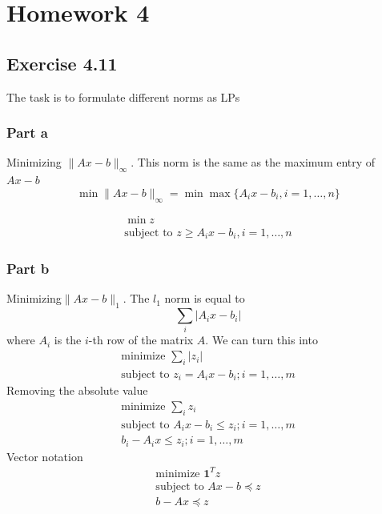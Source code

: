 \section{Homework 4}
\subsection{Exercise 4.11}
The task is to formulate different norms as LPs
\subsubsection{Part a}
Minimizing $\| Ax-b \|_\infty$. This norm is the same as the maximum entry of $Ax-b$
\begin{equation}
  \min \| Ax-b \|_\infty = \min \max \{A_i x - b_i, i=1,\dots,n\} 
\end{equation}

\begin{equation}
  \begin{aligned}
    \min z \\
    \text{subject to } z \geq A_i x - b_i, i = 1,\dots, n
  \end{aligned}
\end{equation}

\subsubsection{Part b}
Minimizing$\| Ax-b \|_1$. The $l_1$ norm is equal to
\begin{equation}
  \sum_i |A_i x - b_i |
\end{equation}
where $A_i$ is the $i$-th row of the matrix $A$. We can turn this into
\begin{equation}
  \begin{aligned}
    \text{minimize } \sum_i |z_i| \\ 
    \text{subject to } z_i = A_i x - b_i; i = 1,\dots,m
  \end{aligned}
\end{equation}
Removing the absolute value
\begin{equation}
  \begin{aligned}
    \text{minimize } \sum_i z_i \\ 
    \text{subject to } A_i x - b_i \leq z_i; i = 1,\dots,m \\
    b_i - A_i x \leq z_i; i = 1,\dots,m 
  \end{aligned}
\end{equation}
Vector notation
\begin{equation}
  \begin{aligned}
    \text{minimize } \textbf{1}^T z \\ 
    \text{subject to } A x - b \preceq z\\
    b - A x \preceq z
  \end{aligned}
\end{equation}

